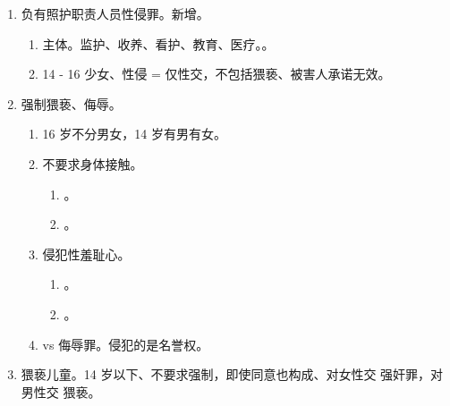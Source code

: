 \begin{enumerate}
\begin{enumerate}
\begin{enumerate}
                  \item 二人轮奸。轮奸未遂问题。。
                  \item 奸淫不满 10 岁幼女或幼女造成伤害、致人重伤或死亡（结果加重犯）。
                  \item 嫖宿幼女已取消。
                \end{enumerate}
        \end{enumerate}
  \item 负有照护职责人员性侵罪。新增。
        \begin{enumerate}
          \item 主体。监护、收养、看护、教育、医疗。。
          \item 14 - 16 少女、性侵 = 仅性交，不包括猥亵、被害人承诺无效。
        \end{enumerate}
  \item 强制猥亵、侮辱。
        \begin{enumerate}
          \item 16 岁不分男女，14 岁有男有女。
          \item 不要求身体接触。
                \begin{enumerate}
                  \item {}。
                  \item {}。
                \end{enumerate}
          \item 侵犯性羞耻心。
                \begin{enumerate}
                  \item {}。
                  \item {}。
                \end{enumerate}
          \item vs 侮辱罪。侵犯的是名誉权。
        \end{enumerate}
  \item 猥亵儿童。14 岁以下、不要求强制，即使同意也构成、对女性交 \yjt 强奸罪，对男性交 \yjt 猥亵。
\end{enumerate}

